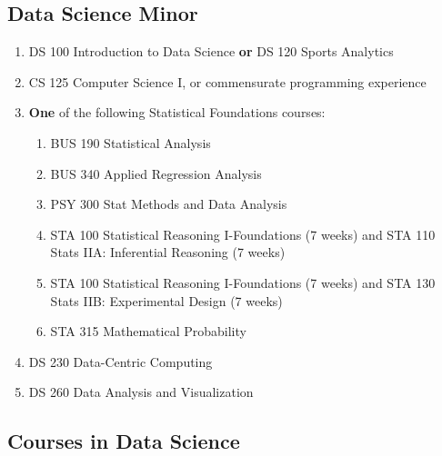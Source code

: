 \documentclass[
  letterpaper,
]{scrbook}
\providecommand{\tightlist}{%
  \setlength{\itemsep}{0pt}\setlength{\parskip}{0pt}}
\begin{document}
\subsection{Data Science Minor}\label{data-science-minor}

\begin{enumerate}
\def\labelenumi{\arabic{enumi}.}
\tightlist
\item
  DS 100 Introduction to Data Science \textbf{or} DS 120 Sports
  Analytics\\
\item
  CS 125 Computer Science I, or commensurate programming experience\\
\item
  \textbf{One} of the following Statistical Foundations courses:

  \begin{enumerate}
  \def\labelenumii{\alph{enumii}.}
  \tightlist
  \item
    BUS 190 Statistical Analysis\\
  \item
    BUS 340 Applied Regression Analysis\\
  \item
    PSY 300 Stat Methods and Data Analysis\\
  \item
    STA 100 Statistical Reasoning I-Foundations (7 weeks) and STA 110
    Stats IIA: Inferential Reasoning (7 weeks)\\
  \item
    STA 100 Statistical Reasoning I-Foundations (7 weeks) and STA 130
    Stats IIB: Experimental Design (7 weeks)\\
  \item
    STA 315 Mathematical Probability\\
  \end{enumerate}
\item
  DS 230 Data-Centric Computing
\item
  DS 260 Data Analysis and Visualization
\end{enumerate}

\subsection{Courses in Data Science}\label{courses-in-data-science}
\end{document}

